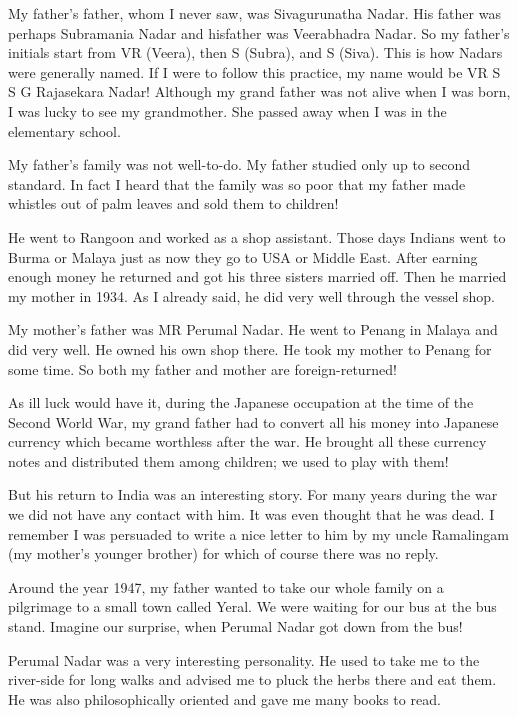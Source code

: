 My father's father, whom I never saw, was Sivagurunatha Nadar. His 
father was perhaps Subramania Nadar and his\break father was Veerabhadra 
Nadar. So my father's initials start from VR (Veera), then S (Subra), 
and S (Siva). This is how Nadars were generally named. If I were to 
follow this practice, my name would be VR S S G Rajasekara Nadar! 
Although my grand father was not alive when I was born, I was lucky to 
see my grandmother. She passed away when I was in the elementary school.

My father's family was not well-to-do. My father studied only up to 
second standard. In fact I heard that the family was so poor that my 
father made whistles out of palm leaves and sold them to children!

He went to Rangoon and worked as a shop assistant. Those days Indians 
went to Burma or Malaya just as now they go to USA or Middle East. After 
earning enough money he returned and got his three sisters married off. 
Then he married my mother in 1934. As I already said, he did very well 
through the vessel shop.

My mother's father was MR Perumal Nadar. He went to Penang in Malaya and 
did very well. He owned his own shop there. He took my mother to Penang 
for some time. So both my father and mother are foreign-returned!

As ill luck would have it, during the Japanese occupation at the time of 
the Second World War, my grand father had to convert all his money into 
Japanese currency which became worthless after the war. He brought all 
these currency notes and distributed them among children; we used to 
play with them!


But his return to India was an interesting story. For many years during 
the war we did not have any contact with him. It was even thought that 
he was dead. I remember I was persuaded to write a nice letter to him by 
my uncle Ramalingam (my mother's younger brother) for which of course 
there was no reply.

Around the year 1947, my father wanted to take our whole family on a 
pilgrimage to a small town called Yeral. We were waiting for our bus at 
the bus stand. Imagine our surprise, when Perumal Nadar got down from 
the bus!

Perumal Nadar was a very interesting personality. He used to take me to 
the river-side for long walks and advised me to pluck the herbs there 
and eat them. He was also philosophically oriented and gave me many 
books to read.

